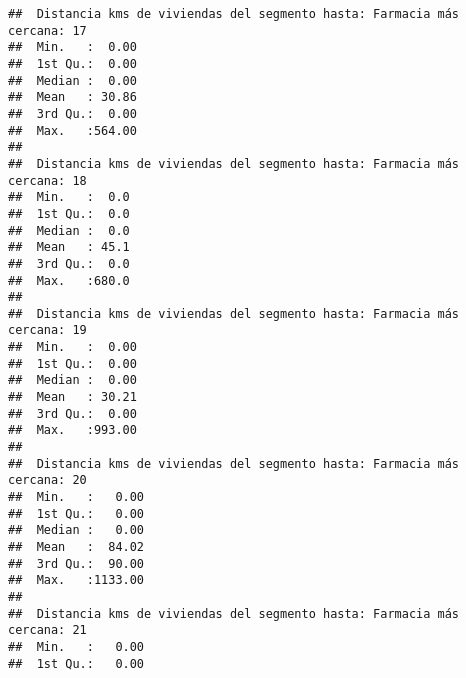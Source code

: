 \documentclass[11pt,]{article}
\begin{document}
\begin{verbatim}
##  Distancia kms de viviendas del segmento hasta: Farmacia más cercana: 17
##  Min.   :  0.00                                                         
##  1st Qu.:  0.00                                                         
##  Median :  0.00                                                         
##  Mean   : 30.86                                                         
##  3rd Qu.:  0.00                                                         
##  Max.   :564.00                                                         
##                                                                         
##  Distancia kms de viviendas del segmento hasta: Farmacia más cercana: 18
##  Min.   :  0.0                                                          
##  1st Qu.:  0.0                                                          
##  Median :  0.0                                                          
##  Mean   : 45.1                                                          
##  3rd Qu.:  0.0                                                          
##  Max.   :680.0                                                          
##                                                                         
##  Distancia kms de viviendas del segmento hasta: Farmacia más cercana: 19
##  Min.   :  0.00                                                         
##  1st Qu.:  0.00                                                         
##  Median :  0.00                                                         
##  Mean   : 30.21                                                         
##  3rd Qu.:  0.00                                                         
##  Max.   :993.00                                                         
##                                                                         
##  Distancia kms de viviendas del segmento hasta: Farmacia más cercana: 20
##  Min.   :   0.00                                                        
##  1st Qu.:   0.00                                                        
##  Median :   0.00                                                        
##  Mean   :  84.02                                                        
##  3rd Qu.:  90.00                                                        
##  Max.   :1133.00                                                        
##                                                                         
##  Distancia kms de viviendas del segmento hasta: Farmacia más cercana: 21
##  Min.   :   0.00                                                        
##  1st Qu.:   0.00                                                        

\end{verbatim}
\end{document}
